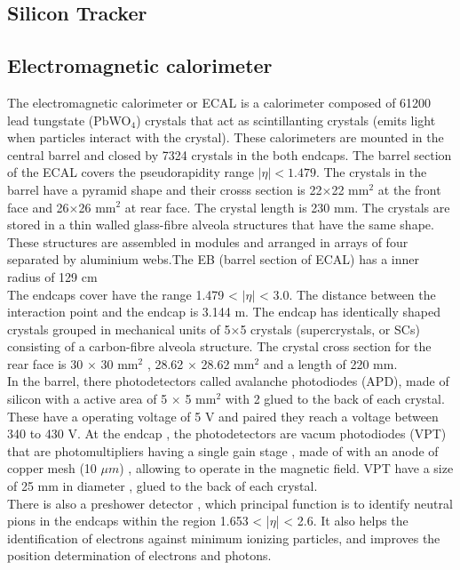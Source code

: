 \begin{linenumbers}
\subsection{Silicon Tracker}



\subsection{Electromagnetic calorimeter}

The electromagnetic calorimeter or ECAL is a calorimeter composed of 61200 lead tungstate (PbWO$_4$) crystals that act as scintillanting crystals (emits light when particles interact with the crystal). These calorimeters are mounted in the central barrel and closed by 7324 crystals in the both endcaps. The barrel section  of the ECAL covers the pseudorapidity range $|\eta| < 1.479$. The crystals in the barrel have a pyramid shape and their crosss section is 22$\times$22 mm$^2$ at the front face and 26$\times$26 mm$^2$ at rear face. The crystal length is 230 mm.  The crystals are stored in a thin walled glass-fibre alveola structures that have the same shape. These structures are assembled in modules  and arranged in arrays of four separated by aluminium webs.The EB (barrel section of ECAL) has a inner radius of 129 cm\cite{cms-manual}\\

The endcaps cover have the  range 1.479 < $|\eta|$ < 3.0. The distance between the interaction point and the endcap is 3.144 m. The endcap has  identically shaped crystals grouped in
mechanical units of 5×5 crystals (supercrystals, or SCs) consisting of a carbon-fibre alveola
structure. The crystal cross section for the rear face is 30 $\times$ 30 mm$^2$ , 28.62 $\times$ 28.62 mm$^2$ and a length of 220 mm.
\\

In the barrel, there photodetectors called avalanche photodiodes (APD), made of silicon with a active area of  5 $\times$ 5 mm$^2$ with 2 glued to the back of each crystal. These have a operating voltage of 5 V and paired they reach a voltage between 340 to 430 V. At the endcap , the photodetectors are vacum photodiodes (VPT) that are photomultipliers having a single gain stage , made of with an anode of copper mesh (10 $\mu m$) , allowing to operate in the magnetic field. VPT have a size of 25 mm in diameter , glued to the back of each crystal.\\

There is also a preshower detector , which principal function  is to identify neutral pions in the
endcaps within the region 1.653 < |$\eta$| < 2.6. It also helps the identification of electrons
against minimum ionizing particles, and improves the position determination of electrons and photons.  %



\end{linenumbers}
